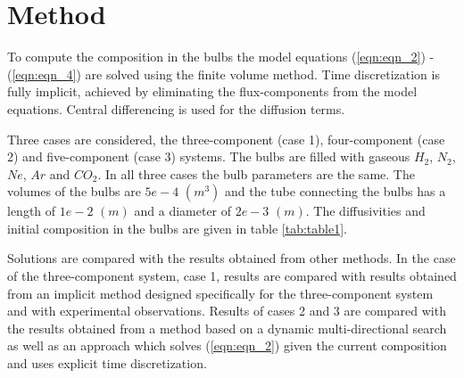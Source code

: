 \documentclass[11]{Report}
\begin{document}
\section*{Method}
To compute the composition in the bulbs the model equations (\ref{eqn:eqn_2}) - (\ref{eqn:eqn_4}) are solved using the finite volume method. Time discretization is fully implicit, achieved by eliminating the flux-components from the model equations. Central differencing is used for the diffusion terms.

Three cases are considered, the three-component (case 1), four-component (case 2) and five-component (case 3) systems. The bulbs are filled with gaseous $H_2$, $N_2$, $Ne$, $Ar$ and $CO_2$. In all three cases the bulb parameters are the same. The volumes of the bulbs are $5e-4$ $(m^3)$ and the tube connecting the bulbs has a length of $1e-2$ $(m)$ and a diameter of $2e-3$ $(m)$. The diffusivities and initial composition in the bulbs are given in table \ref{tab:table1}.

Solutions are compared with the results obtained from other methods. In the case of the three-component system, case 1, results are compared with results obtained from an implicit method designed specifically for the three-component system and with experimental observations. Results of cases 2 and 3 are compared with the results obtained from a method based on a dynamic multi-directional search as well as an approach which solves (\ref{eqn:eqn_2}) given the current composition and uses explicit time discretization. 
\end{document}
